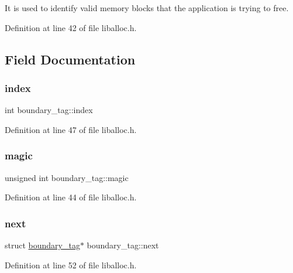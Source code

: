 It is used to identify valid memory blocks that the application is trying to free. 

Definition at line 42 of file liballoc.\+h.



\subsection{Field Documentation}
\mbox{\label{a00095_adfc426eed5361508d62c6e8f484bd270_adfc426eed5361508d62c6e8f484bd270}} 
\subsubsection{\texorpdfstring{index}{index}}
{\footnotesize\ttfamily int boundary\+\_\+tag\+::index}



Definition at line 47 of file liballoc.\+h.

\mbox{\label{a00095_a96a8bec3c60c81b8c41239169ec70b6c_a96a8bec3c60c81b8c41239169ec70b6c}} 
\subsubsection{\texorpdfstring{magic}{magic}}
{\footnotesize\ttfamily unsigned int boundary\+\_\+tag\+::magic}



Definition at line 44 of file liballoc.\+h.

\mbox{\label{a00095_a123f0bd815d7fda9f535b031640662fc_a123f0bd815d7fda9f535b031640662fc}} 
\subsubsection{\texorpdfstring{next}{next}}
{\footnotesize\ttfamily struct \hyperlink{a00095}{boundary\+\_\+tag}$\ast$ boundary\+\_\+tag\+::next}



Definition at line 52 of file liballoc.\+h.

